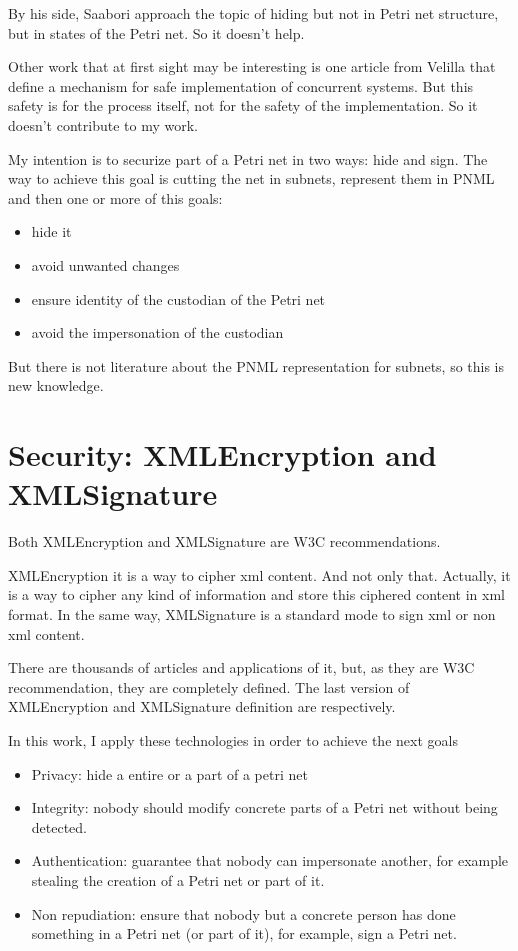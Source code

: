 By his side, Saabori \cite{HID-Saboori20106759} approach the topic of hiding
but not in Petri net structure, but in states of the Petri net. So it doesn't
help. 
 
Other work that at first sight may be interesting is one article from Velilla
\cite{SM-Velilla198875} that define a mechanism for safe implementation of
concurrent systems. But this safety is for the process itself, not for the
safety of the implementation. So it doesn't contribute to my work. 
 
My intention is to securize part of a Petri net in two ways: hide and sign. The way to achieve this goal
is cutting the net in subnets, represent them in PNML and then one or more
of this goals:
\begin{itemize}
\item hide it
\item avoid unwanted changes
\item ensure identity of the custodian of the Petri net
\item avoid the impersonation of the custodian
\end{itemize}

But there is not literature about the PNML representation for subnets, so
this is new knowledge.





\section{Security: XMLEncryption and XMLSignature}

Both XMLEncryption and XMLSignature are W3C recommendations.

XMLEncryption
it is a way to cipher xml content. And not only that. Actually, it is a way to cipher any kind
of information and store this ciphered content in xml format. In the same way, XMLSignature is a standard mode to sign xml or non xml content.

 
There are thousands
of articles and applications of it, but, as they are W3C recommendation, they are completely defined. The last version of XMLEncryption and XMLSignature definition  are \cite{XMLENC-w3.org/xmlenc-core1,XMLSIG-w3.org/xmlsig-core1} respectively.

In this work, I apply these technologies in order to achieve the next goals
\begin{itemize}
\item Privacy: hide a entire or a part of a petri net
\item Integrity: nobody should modify concrete parts of a Petri net without
being detected.
\item Authentication: guarantee that nobody can impersonate another, for
example stealing the creation of a Petri net or part of it.
\item Non repudiation: ensure that nobody but a concrete person has done
something in a Petri net (or part of it), for example, sign a Petri net.

\end{itemize}

